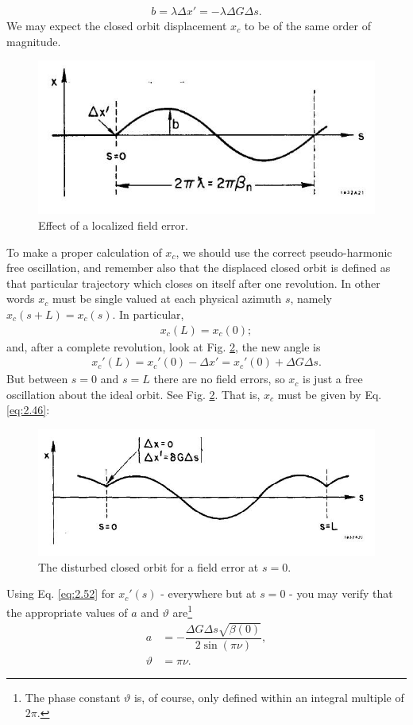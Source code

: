 \begin{align}\label{eq:2.86}
	b = \lambda \Delta x' = -\lambda \Delta G \Delta s.
\end{align}
We may expect the closed orbit displacement $x_c$ to be of the same order of magnitude.
\begin{figure}[!htb]
	\centering
	\includegraphics[width=0.8\linewidth]{./Figuras/fig21.jpeg}
	\caption{Effect of a localized field error.}
	\label{fig:fig21}
\end{figure}
To make a proper calculation of $x_c$, we should use the correct pseudo-harmonic free oscillation, and remember also that the displaced closed orbit is defined as that particular
 trajectory which closes on itself after one revolution. In other words $x_c$ must be single valued at each physical azimuth $s$, namely $x_c(s + L) = x_c(s)$. In particular,
 \begin{align}
	x_c(L) = x_c(0);
\end{align}
and, after a complete revolution, look at Fig. \ref{fig:fig22}, the new angle is
\begin{align}
	x_c'(L) = x_c'(0) - \Delta x' = x_c'(0) + \Delta G \Delta s.
\end{align}
But between $s = 0$ and $s = L$ there are no field errors, so $x_c$ is just a free oscillation about the ideal orbit. See Fig. \ref{fig:fig22}. That is, $x_c$ must be given by Eq. \eqref{eq:2.46}:
\begin{figure}[!htb]
	\centering
	\includegraphics[width=0.8\linewidth]{./Figuras/fig22.jpeg}
	\caption{The disturbed closed orbit for a field error at $s = 0$.}
	\label{fig:fig22}
\end{figure}
Using Eq. \eqref{eq:2.52} for $x_c'(s)$ - everywhere but at $s = 0$ - you may verify that the
appropriate values of $a$ and $\vartheta$ are\footnote{The phase constant $\vartheta$ is, of course, only defined within an integral multiple of $2\pi$.}
\begin{align}
	a &= -\dfrac{\Delta G \Delta s \sqrt{\beta(0)}}{2 \sin {(\pi\nu)}},\\
    \vartheta &= \pi\nu.
\end{align}

